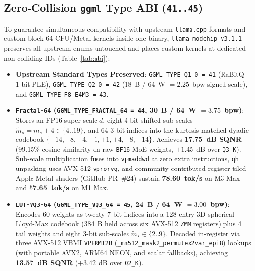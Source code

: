 \documentclass[10pt,twocolumn]{article}
\begin{document}
\subsection{Zero-Collision \texttt{ggml} Type ABI (\texttt{41..45})}
To guarantee simultaneous compatibility with upstream \texttt{llama.cpp} formats and custom block-64 CPU/Metal kernels inside one binary, \texttt{llama-modchip v3.1.1} preserves all upstream enums untouched and places custom kernels at dedicated non-colliding IDs (Table~\ref{tab:abi}):
\begin{itemize}
    \item \textbf{Upstream Standard Types Preserved}: \texttt{GGML\_TYPE\_Q1\_0 = 41} (RaBitQ 1-bit PLE), \texttt{GGML\_TYPE\_Q2\_0 = 42} (18~B / 64~W $= 2.25$~bpw signed-scale), and \texttt{GGML\_TYPE\_F8\_E4M3 = 43}.
    \item \textbf{\texttt{Fractal-64} (\texttt{GGML\_TYPE\_FRACTAL\_64 = 44}, 30~B / 64~W $= 3.75$~bpw)}: Stores an FP16 super-scale $d$, eight 4-bit shifted sub-scales $\tilde{m}_s = m_s + 4 \in \{4..19\}$, and 64 3-bit indices into the kurtosis-matched dyadic codebook $\{-14,-8,-4,-1,+1,+4,+8,+14\}$. Achieves \textbf{17.75~dB SQNR} (99.15\% cosine similarity on raw \texttt{BF16} MoE weights, $+1.45$~dB over \texttt{Q3\_K}). Sub-scale multiplication fuses into \texttt{vpmaddwd} at zero extra instructions, \texttt{qh} unpacking uses AVX-512 \texttt{vprorvq}, and community-contributed register-tiled Apple Metal shaders (GitHub PR~\#24) sustain \textbf{78.60~tok/s} on M3 Max and \textbf{57.65~tok/s} on M1 Max.
    \item \textbf{\texttt{LUT-VQ3-64} (\texttt{GGML\_TYPE\_VQ3\_64 = 45}, 24~B / 64~W $= 3.00$~bpw)}: Encodes 60 weights as twenty 7-bit indices into a 128-entry 3D spherical Lloyd-Max codebook (384~B held across six AVX-512 \texttt{ZMM} registers) plus 4 tail weights and eight 3-bit sub-scales $\tilde{m}_s \in \{2..9\}$. Decoded in-register via three AVX-512 VBMI \texttt{VPERMI2B} (\texttt{\_mm512\_mask2\_permutex2var\_epi8}) lookups (with portable AVX2, ARM64 NEON, and scalar fallbacks), achieving \textbf{13.57~dB SQNR} ($+3.42$~dB over \texttt{Q2\_K}).
\end{itemize}
\end{document}
